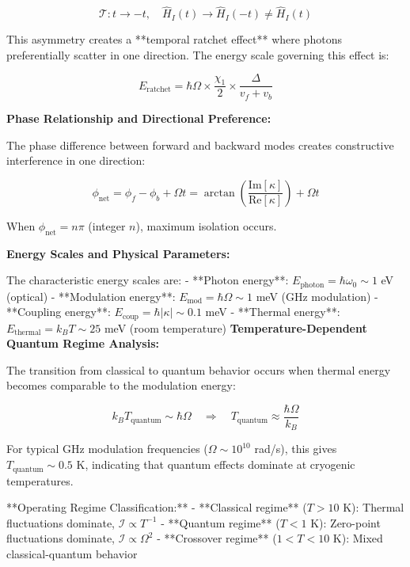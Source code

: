 \documentclass[11pt]{article}
\begin{document}
\begin{equation}
\mathcal{T}: t \to -t, \quad \hat{H}_I(t) \to \hat{H}_I(-t) \neq \hat{H}_I(t)
\end{equation}

This asymmetry creates a **temporal ratchet effect** where photons preferentially scatter in one direction. The energy scale governing this effect is:

\begin{equation}
E_{\text{ratchet}} = \hbar\Omega \times \frac{\chi_1}{2} \times \frac{\Delta}{v_f + v_b}
\end{equation}

\textbf{Phase Relationship and Directional Preference:}

The phase difference between forward and backward modes creates constructive interference in one direction:

\begin{equation}
\phi_{\text{net}} = \phi_f - \phi_b + \Omega t = \arctan\left(\frac{\text{Im}[\kappa]}{\text{Re}[\kappa]}\right) + \Omega t
\end{equation}

When $\phi_{\text{net}} = n\pi$ (integer $n$), maximum isolation occurs.

\textbf{Energy Scales and Physical Parameters:}

The characteristic energy scales are:
- **Photon energy**: $E_{\text{photon}} = \hbar\omega_0 \sim 1$ eV (optical)
- **Modulation energy**: $E_{\text{mod}} = \hbar\Omega \sim 1$ meV (GHz modulation)
- **Coupling energy**: $E_{\text{coup}} = \hbar|\kappa| \sim 0.1$ meV
- **Thermal energy**: $E_{\text{thermal}} = k_B T \sim 25$ meV (room temperature)
\textbf{Temperature-Dependent Quantum Regime Analysis:}

The transition from classical to quantum behavior occurs when thermal energy becomes comparable to the modulation energy:

\begin{equation}
k_B T_{\text{quantum}} \sim \hbar\Omega \quad \Rightarrow \quad T_{\text{quantum}} \approx \frac{\hbar\Omega}{k_B}
\end{equation}

For typical GHz modulation frequencies ($\Omega \sim 10^{10}$ rad/s), this gives $T_{\text{quantum}} \sim 0.5$ K, indicating that quantum effects dominate at cryogenic temperatures.

**Operating Regime Classification:**
- **Classical regime** ($T > 10$ K): Thermal fluctuations dominate, $\mathcal{I} \propto T^{-1}$
- **Quantum regime** ($T < 1$ K): Zero-point fluctuations dominate, $\mathcal{I} \propto \Omega^2$
- **Crossover regime** ($1 < T < 10$ K): Mixed classical-quantum behavior
\end{document}
